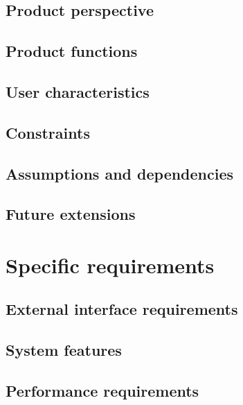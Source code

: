 \documentclass[12pt, a4paper]{report}
\begin{document}
\section{Product perspective}


\section{Product functions}


\section{User characteristics}


\section{Constraints}


\section{Assumptions and dependencies}


\section{Future extensions}


\chapter{Specific requirements}
\label{ch:requirements}

\section{External interface requirements}


\section{System features}


\section{Performance requirements}

\end{document}
